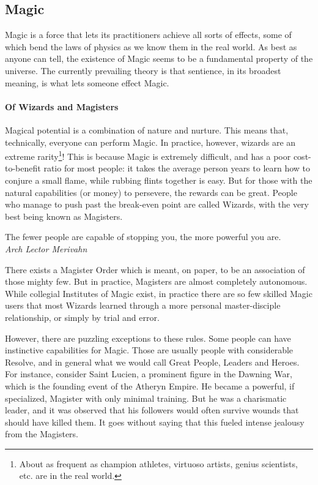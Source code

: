 \subsection{Magic}

\label{magic_lore}

Magic is a force that lets its practitioners achieve all sorts of effects, some of which bend the laws of physics as we know them in the real world. As best as anyone can tell, the existence of Magic seems to be a fundamental property of the universe. The currently prevailing theory is that sentience, in its broadest meaning, is what lets someone effect Magic.


\paragraph{Of Wizards and Magisters}

Magical potential is a combination of nature and nurture. This means that, technically, everyone can perform Magic. In practice, however, wizards are an extreme rarity\footnote{About as frequent as champion athletes, virtuoso artists, genius scientists, etc. are in the real world.}! This is because Magic is extremely difficult, and has a poor cost-to-benefit ratio for most people: it takes the average person years to learn how to conjure a small flame, while rubbing flints together is easy.  But for those with the natural capabilities (or money) to persevere, the rewards can be great. People who manage to push past the break-even point are called Wizards, with the very best being known as Magisters.


\begin{rpg-quotebox}
   The fewer people are capable of stopping you, the more powerful you are. \\ \textendash \textit{Arch Lector Merivahn}
\end{rpg-quotebox}

There exists a Magister Order which is meant, on paper, to be an association of those mighty few. But in practice, Magisters are almost completely autonomous. While collegial Institutes of Magic exist, in practice there are so few skilled Magic users that most Wizards learned through a more personal master-disciple relationship, or simply by trial and error. 

However, there are puzzling exceptions to these rules. Some people can have instinctive capabilities for Magic. Those are usually people with considerable Resolve, and in general what we would call Great People, Leaders and Heroes. For instance, consider Saint Lucien, a prominent figure in the Dawning War, which is the founding event of the Atheryn Empire. He became a powerful, if specialized, Magister with only minimal training. But he was a charismatic leader, and it was observed that his followers would often survive wounds that should have killed them. It goes without saying that this fueled intense jealousy from the Magisters.

